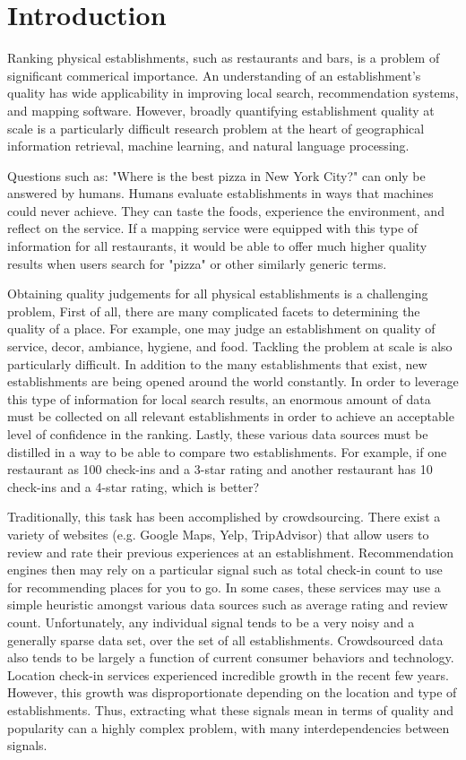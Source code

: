 \vspace{0.1in}
\section{Introduction}
\label{sec:introduction}

Ranking physical establishments, such as restaurants and bars, is a problem
of significant commerical importance.
An understanding of an establishment's quality has wide applicability in improving
local search, recommendation systems, and mapping software.
However, broadly quantifying establishment quality at scale is a particularly difficult
research problem at the heart of geographical information retrieval, machine learning, and
natural language processing.

Questions such as: "Where is the best pizza in New York City?" can only be answered by humans.
Humans evaluate establishments in ways that machines could never achieve.
They can taste the foods, experience the environment, and reflect on the service.
If a mapping service were equipped with this type of information for all restaurants,
it would be able to offer much higher quality results when users search for "pizza" or
other similarly generic terms.

Obtaining quality judgements for all physical establishments is a challenging problem,
First of all, there are many complicated facets to determining the quality of a place.
For example, one may judge an establishment on quality of service, decor,
ambiance, hygiene, and food.
Tackling the problem at scale is also particularly difficult.
In addition to the many establishments that exist, new establishments are
being opened around the world constantly.
In order to leverage this type of information for local search results,
an enormous amount of data must be collected on all relevant establishments in order to 
achieve an acceptable level of confidence in the ranking.
Lastly, these various data sources must be distilled in a way to be able to compare
two establishments.
For example, if one restaurant as 100 check-ins and a 3-star rating and
another restaurant has 10 check-ins and a 4-star rating, which is better?

Traditionally, this task has been accomplished by crowdsourcing.
There exist a variety of websites (e.g. Google Maps, Yelp, TripAdvisor)
that allow users to review and rate their previous experiences at an establishment.
Recommendation engines then may rely on a particular signal such as total check-in count
to use for recommending places for you to go.
In some cases, these services may use a simple heuristic amongst various data sources
such as average rating and review count.
Unfortunately, any individual signal tends to be a very noisy and a generally sparse data set,
over the set of all establishments.
Crowdsourced data also tends to be largely a function of current consumer behaviors and technology.
Location check-in services experienced incredible growth in the recent few years.
However, this growth was disproportionate depending on the location
and type of establishments.
Thus, extracting what these signals mean in terms of quality and popularity can a highly
complex problem, with many interdependencies between signals.

